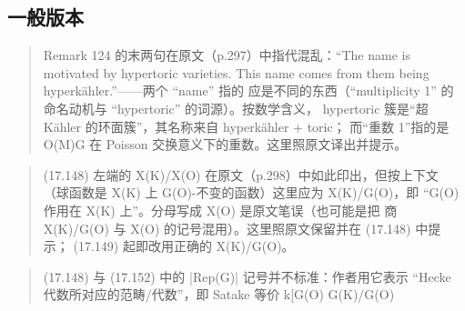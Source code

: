 \subsection*{一般版本}
\begin{quote}\small
Remark 124 的末两句在原文（p.297）中指代混乱：“The name is motivated by hypertoric varieties. This name comes from them being hyperkähler.”——两个 “name” 指的 应是不同的东西（“multiplicity 1” 的命名动机与 “hypertoric” 的词源）。按数学含义， hypertoric 簇是“超 Kähler 的环面簇”，其名称来自 hyperkähler + toric； 而“重数 1”指的是 O(M)G 在 Poisson 交换意义下的重数。这里照原文译出并提示。
\end{quote}

\begin{quote}\small
(17.148) 左端的 X(K)/X(O) 在原文（p.298）中如此印出，但按上下文 （球函数是 X(K) 上 G(O)-不变的函数）这里应为 X(K)/G(O)，即 “G(O) 作用在 X(K) 上”。分母写成 X(O) 是原文笔误（也可能是把 商 X(K)/G(O) 与 X(O) 的记号混用）。这里照原文保留并在 (17.148) 中提示； (17.149) 起即改用正确的 X(K)/G(O)。
\end{quote}

\begin{quote}\small
(17.148) 与 (17.152) 中的 |Rep(G)| 记号并不标准：作者用它表示 “Hecke 代数所对应的范畴/代数”，即 Satake 等价 k[G(O) G(K)/G(O)
\end{quote}
